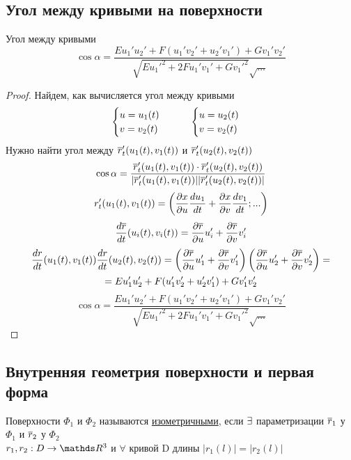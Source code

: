 \documentclass[main]{subfiles}
\begin{document}
	\subsection{Угол между кривыми на поверхности}
	\begin{theorem}
		Угол между кривыми
		\[\cos \alpha = \dfrac{E u_1' u_2' + F(u_1' v_2' + u_2' v_1') + G v_1' v_2'}{\sqrt{E u_1'^2 + 2 F u_1' v_1' + G v_1'^2} \sqrt{...}}\]
	\end{theorem}

	\begin{proof}
		Найдем, как вычисляется угол между кривыми
		\[\begin{cases}
		  u=u_1(t)\\
		  v=v_2(t)
		\end{cases} \qquad
		\begin{cases}
		  u=u_2(t)\\
		  v=v_2(t)
		\end{cases}\]
		Нужно найти угол между $\overline{r}_t'(u_1(t), v_1(t))$ и $\overline{r}_t'(u_2(t), v_2(t))$
		\[\cos \alpha = \dfrac{\overline{r}_t'(u_1(t), v_1(t)) \cdot \overline{r}_t'(u_2(t), v_2(t))}{|\overline{r}_t'(u_1(t), v_1(t))| |\overline{r}_t'(u_2(t), v_2(t))|}\]
		\[r_t'(u_1(t), v_1(t)) = \left(\dfrac{\partial x}{\partial u} \dfrac{d u_1}{dt} + \dfrac{\partial x}{\partial v} \dfrac{d v_1}{dt};...\right)\]
		\[\dfrac{d \overline{r}}{dt} (u_i(t), v_i(t)) = \dfrac{\partial \overline{r}}{\partial u} u_i' + \dfrac{\partial \overline{r}}{\partial v} v_i'\]
		\begin{multline*}
		    \dfrac{dr}{dt}(u_1(t),v_1(t)) \dfrac{dr}{dt}(u_2(t),v_2(t)) = \left(\dfrac{\partial \overline{r}}{\partial u} u_1' + \dfrac{\partial \overline{r}}{\partial v} v_1'\right) \left(\dfrac{\partial \overline{r}}{\partial u} u_2' + \dfrac{\partial \overline{r}}{\partial v} v_2'\right) =\\
		    = E u_1' u_2' + F(u_1' v_2'+ u_2' v_1') + G v_1' v_2'
		\end{multline*}
		\[\cos \alpha = \dfrac{E u_1' u_2' + F(u_1' v_2' + u_2' v_1') + G v_1' v_2'}{\sqrt{E u_1'^2 + 2 F u_1' v_1' + G v_1'^2} \sqrt{...}}\]
	\end{proof}

	\subsection{Внутренняя геометрия поверхности и первая форма}

	\begin{definition}
		Поверхности $\Phi_1$ и $\Phi_2$ называются \ul{изометричными}, если $\exists$ параметризации $\overline{r}_1$ у $\Phi_1$ и $\overline{r}_2$ у $\Phi_2$\\
		$r_1,r_2: D \ra \R^3$ и $\forall$ кривой D длины $|r_1(l)| = |r_2(l)|$
	\end{definition}
\end{document}
